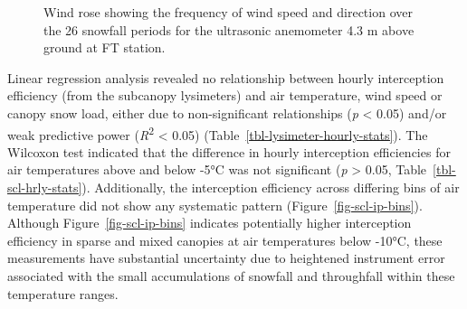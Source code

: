 \documentclass[
  letterpaper,
  DIV=11,
  numbers=noendperiod]{scrartcl}
\begin{document}

\begin{figure}[H]


\caption{\label{fig-wind-rose}Wind rose showing the frequency of wind
speed and direction over the 26 snowfall periods for the ultrasonic
anemometer 4.3 m above ground at FT station.}

\end{figure}%

Linear regression analysis revealed no relationship between hourly
interception efficiency (from the subcanopy lysimeters) and air
temperature, wind speed or canopy snow load, either due to
non-significant relationships (\emph{p} \textless{} 0.05) and/or weak
predictive power (\emph{R}\textsuperscript{2} \textless{} 0.05)
(Table~\ref{tbl-lysimeter-hourly-stats}). The Wilcoxon test indicated
that the difference in hourly interception efficiencies for air
temperatures above and below -5°C was not significant (\emph{p}
\textgreater{} 0.05, Table~\ref{tbl-scl-hrly-stats}). Additionally, the
interception efficiency across differing bins of air temperature did not
show any systematic pattern (Figure~\ref{fig-scl-ip-bins}). Although
Figure~\ref{fig-scl-ip-bins} indicates potentially higher interception
efficiency in sparse and mixed canopies at air temperatures below -10°C,
these measurements have substantial uncertainty due to heightened
instrument error associated with the small accumulations of snowfall and
throughfall within these temperature ranges.
\end{document}
